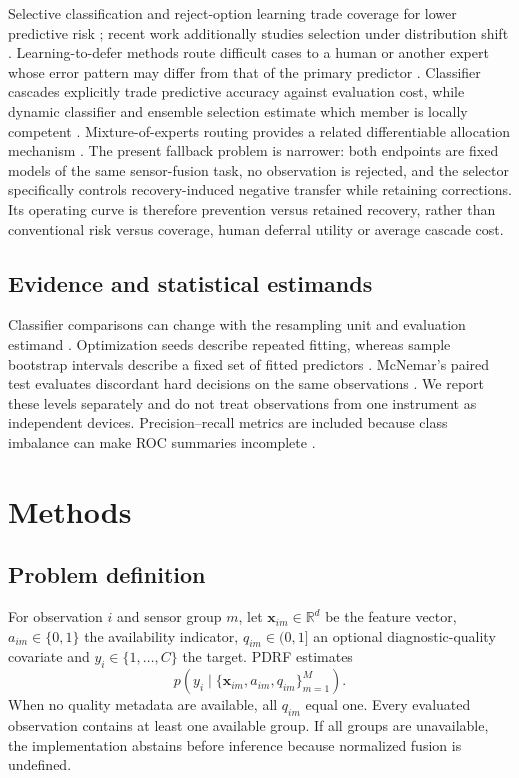 \documentclass[11pt]{article}
\begin{document}
Selective classification and reject-option learning trade coverage for lower predictive risk \citep{elyaniv2010selective,geifman2019selectivenet,franc2023reject}; recent work additionally studies selection under distribution shift \citep{liang2024selective}. Learning-to-defer methods route difficult cases to a human or another expert whose error pattern may differ from that of the primary predictor \citep{mozannar2020defer,tailor2024population}. Classifier cascades explicitly trade predictive accuracy against evaluation cost, while dynamic classifier and ensemble selection estimate which member is locally competent \citep{chen2012cascade,cruz2018dynamic}. Mixture-of-experts routing provides a related differentiable allocation mechanism \citep{park2025mome}. The present fallback problem is narrower: both endpoints are fixed models of the same sensor-fusion task, no observation is rejected, and the selector specifically controls recovery-induced negative transfer while retaining corrections. Its operating curve is therefore prevention versus retained recovery, rather than conventional risk versus coverage, human deferral utility or average cascade cost.

\subsection{Evidence and statistical estimands}

Classifier comparisons can change with the resampling unit and evaluation estimand \citep{dietterich1998tests,demsar2006statistical}. Optimization seeds describe repeated fitting, whereas sample bootstrap intervals describe a fixed set of fitted predictors \citep{efron1994bootstrap}. McNemar's paired test evaluates discordant hard decisions on the same observations \citep{mcnemar1947correlated}. We report these levels separately and do not treat observations from one instrument as independent devices. Precision--recall metrics are included because class imbalance can make ROC summaries incomplete \citep{saito2015precision}.

\section{Methods}

\subsection{Problem definition}

For observation $i$ and sensor group $m$, let $\mathbf{x}_{im}\in\mathbb{R}^{d}$ be the feature vector, $a_{im}\in\{0,1\}$ the availability indicator, $q_{im}\in(0,1]$ an optional diagnostic-quality covariate and $y_i\in\{1,\ldots,C\}$ the target. PDRF estimates
\begin{equation}
p\!\left(y_i\mid\{\mathbf{x}_{im},a_{im},q_{im}\}_{m=1}^{M}\right).
\end{equation}
When no quality metadata are available, all $q_{im}$ equal one. Every evaluated observation contains at least one available group. If all groups are unavailable, the implementation abstains before inference because normalized fusion is undefined.
\end{document}
